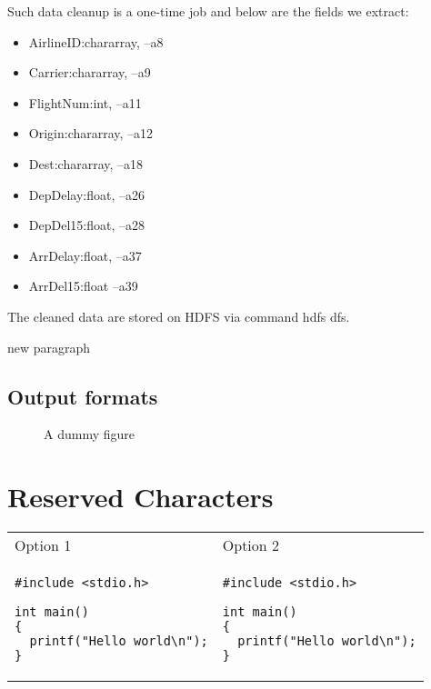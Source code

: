 \documentclass[fontsize=11pt,paper=a4,pagesize=auto]{scrbook}
\begin{document}
\par Such data cleanup is a one-time job and below are the fields we extract: 
\begin{itemize}
\item       AirlineID:chararray, --a8
\item            Carrier:chararray,   --a9
\item            FlightNum:int,       --a11
\item            Origin:chararray,    --a12       
\item            Dest:chararray,      --a18
\item            DepDelay:float,      --a26
\item            DepDel15:float,      --a28
\item            ArrDelay:float,      --a37 
\item            ArrDel15:float       --a39
\end{itemize}

\par The cleaned data are stored on HDFS via command hdfs dfs. 

new paragraph



 
\subsection{Output formats}
\begin{figure}

\caption{A dummy figure}
\end{figure}

 
\blindtext
 
 
\section{Reserved Characters}
 

\begin{tabular}{|p{6cm}|p{6cm}|}
Option 1  &  Option  2  \\
\begin{lstlisting}
#include <stdio.h>

int main()
{
  printf("Hello world\n");
}
\end{lstlisting}&
\begin{lstlisting}
#include <stdio.h>

int main()
{
  printf("Hello world\n");
}
\end{lstlisting}

\end{tabular} 


 
\end{document}
